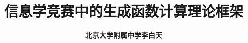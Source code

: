 \documentclass[12pt]{ctexart}
\title{\textbf{\Huge 信息学竞赛中的生成函数计算理论框架}}
\author{\textbf{北京大学附属中学\quad 李白天}}
\date{}
\theoremstyle{plain}
\theoremstyle{definition}
\newif\ifcont
\begin{document}
\maketitle

\conttrue


\end{document}
